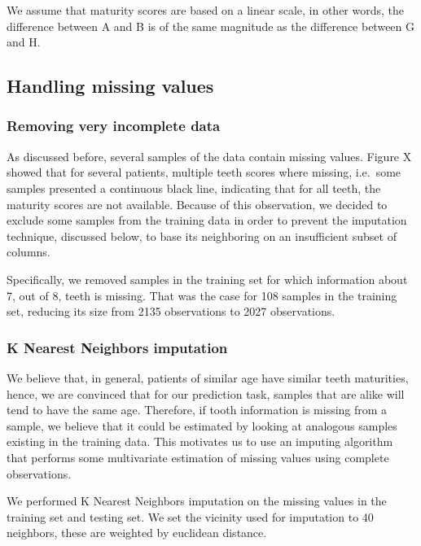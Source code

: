 \documentclass[11pt,]{article}
\begin{document}
We assume that maturity scores are based on a linear scale, in other
words, the difference between A and B is of the same magnitude as the
difference between G and H.

\hypertarget{handling-missing-values}{%
\subsection{Handling missing values}\label{handling-missing-values}}

\hypertarget{removing-very-incomplete-data}{%
\subsubsection{Removing very incomplete
data}\label{removing-very-incomplete-data}}

As discussed before, several samples of the data contain missing values.
Figure X showed that for several patients, multiple teeth scores where
missing, i.e.~some samples presented a continuous black line, indicating
that for all teeth, the maturity scores are not available. Because of
this observation, we decided to exclude some samples from the training
data in order to prevent the imputation technique, discussed below, to
base its neighboring on an insufficient subset of columns.

Specifically, we removed samples in the training set for which
information about 7, out of 8, teeth is missing. That was the case for
108 samples in the training set, reducing its size from 2135
observations to 2027 observations.

\hypertarget{k-nearest-neighbors-imputation}{%
\subsubsection{K Nearest Neighbors
imputation}\label{k-nearest-neighbors-imputation}}

We believe that, in general, patients of similar age have similar teeth
maturities, hence, we are convinced that for our prediction task,
samples that are alike will tend to have the same age. Therefore, if
tooth information is missing from a sample, we believe that it could be
estimated by looking at analogous samples existing in the training data.
This motivates us to use an imputing algorithm that performs some
multivariate estimation of missing values using complete observations.

We performed K Nearest Neighbors imputation on the missing values in the
training set and testing set. We set the vicinity used for imputation to
40 neighbors, these are weighted by euclidean distance.
\end{document}
